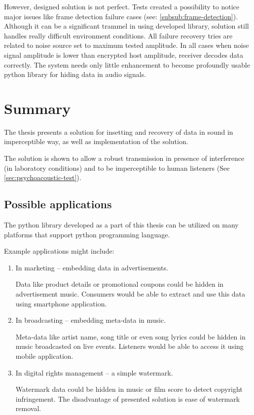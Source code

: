\documentclass[english,bachelor,a4paper,oneside]{ppfcmthesis}
\begin{document}
However, designed solution is not perfect. Tests created a possibility to notice major issues like frame detection failure
cases (see: \ref{subsub:frame-detection}). Although it can be a significant trammel in using developed library, solution
still handles really difficult environment conditions. All failure recovery tries are related to noise source set to maximum 
tested amplitude. In all cases when noise signal amplitude is lower than encrypted host amplitude, receiver decodes data correctly.
The system needs only little enhancement to become profoundly usable python library for hiding data in audio signals.

\chapter{Summary}
\label{chap:summary}

The thesis presents a solution for insetting and recovery of data in sound in imperceptible way, as well as
implementation of the solution.

The solution is shown to allow a robust transmission in presence of interference (in laboratory conditions) and to be
imperceptible to human listeners (See \ref{sec:psychoacoustic-test}).

\section{Possible applications}

The python library developed as a part of this thesis can be utilized on many platforms that support python programming language.

Example applications might include:

\begin{enumerate}
\item In marketing -- embedding data in advertisements.

Data like product details or promotional coupons could be hidden in advertisement music. Consumers would be able to
extract and use this data using smartphone application.

\item In broadcasting -- embedding meta-data in music.

Meta-data like artist name, song title or even song lyrics could be hidden in music broadcasted on live events.
Listeners would be able to access it using mobile application.

\item In digital rights management -- a simple watermark.

Watermark data could be hidden in music or film score to detect copyright infringement. The disadvantage of presented
solution is ease of watermark removal.
\end{enumerate}
\end{document}

